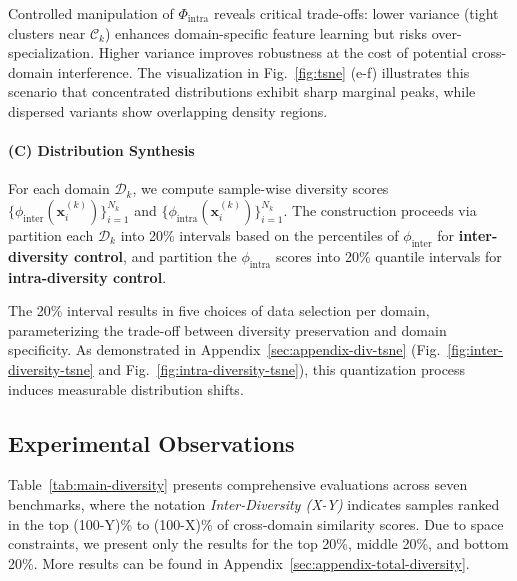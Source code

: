Controlled manipulation of \( \Phi_{\text{intra}} \) reveals critical trade-offs: lower variance (tight clusters near \( \mathcal{C}_k \)) enhances domain-specific feature learning but risks over-specialization. Higher variance improves robustness at the cost of potential cross-domain interference. The visualization in Fig.~\ref{fig:tsne} (e-f) illustrates this scenario that concentrated distributions exhibit sharp marginal peaks, while dispersed variants show overlapping density regions.

\paragraph{(C) Distribution Synthesis} For each domain \( \mathcal{D}_k \), we compute sample-wise diversity scores \( \{\phi_{\text{inter}}(\mathbf{x}_i^{(k)})\}_{i=1}^{N_k} \) and \( \{\phi_{\text{intra}}(\mathbf{x}_i^{(k)})\}_{i=1}^{N_k} \). The construction proceeds via partition each \( \mathcal{D}_k \) into 20\% intervals based on the percentiles of \( \phi_{\text{inter}} \) for \textbf{inter-diversity control}, and partition the \( \phi_{\text{intra}} \) scores into 20\% quantile intervals for \textbf{intra-diversity control}.

The 20\% interval results in five choices of data selection per domain, parameterizing the trade-off between diversity preservation and domain specificity.
As demonstrated in Appendix~\ref{sec:appendix-div-tsne} (Fig.~\ref{fig:inter-diversity-tsne} and Fig.~\ref{fig:intra-diversity-tsne}), this quantization process induces measurable distribution shifts.

\subsection{Experimental Observations}
\label{sec:exps-observation}

Table~\ref{tab:main-diversity} presents comprehensive evaluations across seven benchmarks, where the notation \textit{Inter-Diversity (X-Y)} indicates samples ranked in the top (100-Y)\% to (100-X)\% of cross-domain similarity scores. Due to space constraints, we present only the results for the top 20\%, middle 20\%, and bottom 20\%. More results can be found in Appendix~\ref{sec:appendix-total-diversity}.

